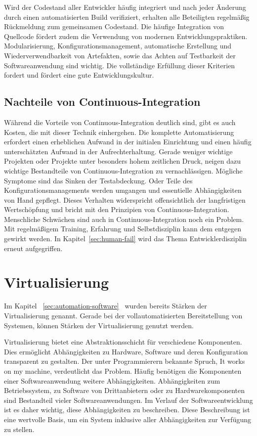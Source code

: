 Wird der Codestand aller Entwickler häufig integriert und nach jeder Änderung durch einen automatisierten Build verifiziert, erhalten alle Beteiligten regelmäßig Rückmeldung zum gemeinsamen Codestand.
Die häufige Integration von Quellcode fördert zudem die Verwendung von modernen Entwicklungspraktiken. Modularisierung, Konfigurationsmanagement, automatische Erstellung und Wiederverwendbarkeit von Artefakten, sowie das Achten auf Testbarkeit der Softwareanwendung sind wichtig. Die vollständige Erfüllung dieser Kriterien fordert und fördert eine gute Entwicklungskultur.

\subsection{Nachteile von Continuous-Integration}

Während die Vorteile von Continuous-Integration deutlich sind, gibt es auch Kosten, die mit dieser Technik einhergehen. Die komplette Automatisierung erfordert einen erheblichen Aufwand in der initialen Einrichtung und einen häufig unterschätzten Aufwand in der Aufrechterhaltung. 
Gerade weniger wichtige Projekten oder Projekte unter besonders hohem zeitlichen Druck, neigen dazu wichtige Bestandteile von Continuous-Integration zu vernachlässigen. Mögliche Symptome sind das Sinken der Testabdeckung. Oder Teile des Konfigurationsmanagements werden umgangen und essentielle Abhängigkeiten von Hand gepflegt. Dieses Verhalten widerspricht offensichtlich der langfristigen Wertschöpfung und bricht mit den Prinzipien von Continuous-Integration. Menschliche Schwächen sind auch in Continuous-Integration noch ein Problem. Mit regelmäßigem 
Training, Erfahrung und Selbstdisziplin kann dem entgegen gewirkt werden. In Kapitel~\ref{sec:human-fail} wird das Thema Entwicklerdisziplin erneut aufgegriffen.

\section{Virtualisierung}

Im Kapitel ~\ref{sec:automation-software}~ wurden bereits Stärken der Virtualisierung genannt. Gerade bei der vollautomatisierten Bereitstellung von Systemen, können Stärken der Virtualisierung genutzt werden.

Virtualisierung bietet eine Abstraktionsschicht für verschiedene Komponenten. Dies ermöglicht Abhängigkeiten zu Hardware, Software und deren Konfiguration transparent zu gestalten. Der unter Programmierern bekannte Spruch, \glqq It works on my machine\grqq{}, verdeutlicht das Problem. Häufig benötigen die Komponenten einer Softwareanwendung weitere Abhängigkeiten. Abhängigkeiten zum Betriebssystem, zu Software von Drittanbietern oder zu Hardwarekomponenten sind Bestandteil
vieler Softwareanwendungen. Im Verlauf der Softwareentwicklung ist es daher wichtig, diese Abhängigkeiten zu beschreiben. Diese Beschreibung ist eine wertvolle Basis, um ein System inklusive aller Abhängigkeiten zur Verfügung zu stellen.

